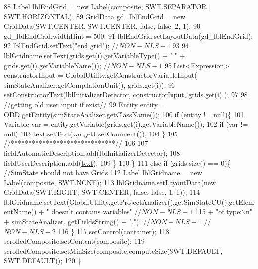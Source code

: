 \begin{DoxyCode}
88                 Label lblEndGrid = \textcolor{keyword}{new} Label(composite, SWT.SEPARATOR | SWT.HORIZONTAL);
89                 GridData gd\_lblEndGrid = \textcolor{keyword}{new} GridData(SWT.CENTER, SWT.CENTER, \textcolor{keyword}{false}, \textcolor{keyword}{false}, 2, 1);
90                 gd\_lblEndGrid.widthHint = 500;
91                 lblEndGrid.setLayoutData(gd\_lblEndGrid);
92                 lblEndGrid.setText(\textcolor{stringliteral}{"end grid"}); \textcolor{comment}{//$NON-NLS-1$}
93                 
94                 lblGridname.setText(grids.get(i).getVariableType() + \textcolor{stringliteral}{" "} + grids.get(i).getVariableName());     
       \textcolor{comment}{//$NON-NLS-1$}
95                 List<Expression> constructorInput = GlobalUtility.getConstructorVariableInput(
      simStateAnalizer.getCompilationUnit(), grids.get(i));
96                 \hyperlink{classit_1_1isislab_1_1masonhelperdocumentation_1_1mason_1_1wizards_1_1_g___grids_cell_page_a10e043dce0e8661cadbb7a6ea569cb0e}{setConstructorText}(lblInitializerDetector, constructorInput, grids.get(i)
      );       
97                 
98                 \textcolor{comment}{//getting old user input if exist//}
99                 Entity entity = ODD.getEntity(simStateAnalizer.getClassName());
100                 \textcolor{keywordflow}{if} (entity != null)\{
101                     Variable var = entity.getVariable(grids.get(i).getVariableName());
102                     \textcolor{keywordflow}{if} (var != null)
103                         text.setText(var.getUserComment());
104                 \}
105                 \textcolor{comment}{//******************************//}
106                 
107                 fieldAutomaticDescription.add(lblInitializerDetector);
108                 fieldUserDescription.add(\hyperlink{classit_1_1isislab_1_1masonhelperdocumentation_1_1mason_1_1wizards_1_1_g___grids_cell_page_aaccd7bc0434484906b1e388bd6b5a1cc}{text});
109             \}
110         \}
111         \textcolor{keywordflow}{else} \textcolor{keywordflow}{if} (grids.size() == 0)\{    \textcolor{comment}{//SimState should not have Grids}
112             Label lblGridname = \textcolor{keyword}{new} Label(composite, SWT.NONE);
113             lblGridname.setLayoutData(\textcolor{keyword}{new} GridData(SWT.RIGHT, SWT.CENTER, \textcolor{keyword}{false}, \textcolor{keyword}{false}, 1, 1));
114             lblGridname.setText(GlobalUtility.getProjectAnalizer().getSimStateCU().getElementName() + \textcolor{stringliteral}{"
       doesn't contains variables"} \textcolor{comment}{//$NON-NLS-1$}
115                     + \textcolor{stringliteral}{"of type:\(\backslash\)n"} + \hyperlink{classit_1_1isislab_1_1masonhelperdocumentation_1_1mason_1_1wizards_1_1_g___grids_cell_page_aadd93c2041dd8e74fd87a3a432504fa2}{simStateAnalizer}.
      \hyperlink{classit_1_1isislab_1_1masonhelperdocumentation_1_1analizer_1_1_sim_state_analizer_a40662d69fe3007c3a074d257c2c40dac}{getFieldsString}() + \textcolor{stringliteral}{"."}); \textcolor{comment}{//$NON-NLS-1$ //$NON-NLS-2$}
116         \}
117         setControl(container);
118         scrolledComposite.setContent(composite);
119         scrolledComposite.setMinSize(composite.computeSize(SWT.DEFAULT, SWT.DEFAULT));
120     \}
\end{DoxyCode}


